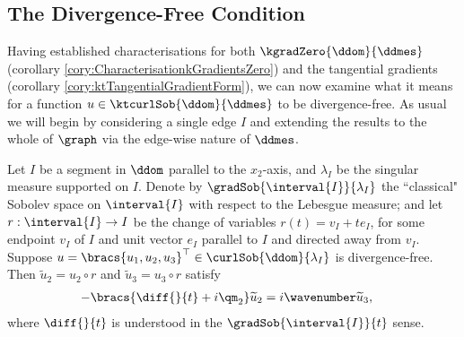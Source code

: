 \subsection{The Divergence-Free Condition} \label{sec:ktDivFree}
Having established characterisations for both $\kgradZero{\ddom}{\ddmes}$ (corollary \ref{cory:CharacterisationkGradientsZero}) and the tangential gradients (corollary \ref{cory:ktTangentialGradientForm}), we can now examine what it means for a function $u\in\ktcurlSob{\ddom}{\ddmes}$ to be divergence-free.
As usual we will begin by considering a single edge $I$ and extending the results to the whole of $\graph$ via the edge-wise nature of $\ddmes$.
\begin{lemma} \label{lem:DivFreeParallelSegment}
	Let $I$ be a segment in $\ddom$ parallel to the $x_2$-axis, and $\lambda_I$ be the singular measure supported on $I$.
	Denote by $\gradSob{\interval{I}}{\lambda_I}$ the ``classical" Sobolev space on $\interval{I}$ with respect to the Lebesgue measure; and let $r:\interval{I}\rightarrow I$ be the change of variables $r(t)= v_I + t e_I$, for some endpoint $v_I$ of $I$ and unit vector $e_I$ parallel to $I$ and directed away from $v_I$.
	Suppose $u=\bracs{u_1, u_2, u_3}^\top\in\curlSob{\ddom}{\lambda_I}$ is divergence-free.
	Then $\widetilde{u}_2 = u_2 \circ r$ and $\widetilde{u}_3 = u_3 \circ r$ satisfy
	\begin{align*}
		-\bracs{\diff{}{t} + i\qm_2}\widetilde{u}_2 &= i\wavenumber\widetilde{u}_3,
	\end{align*}
	where $\diff{}{t}$ is understood in the $\gradSob{\interval{I}}{t}$ sense.
\end{lemma}
